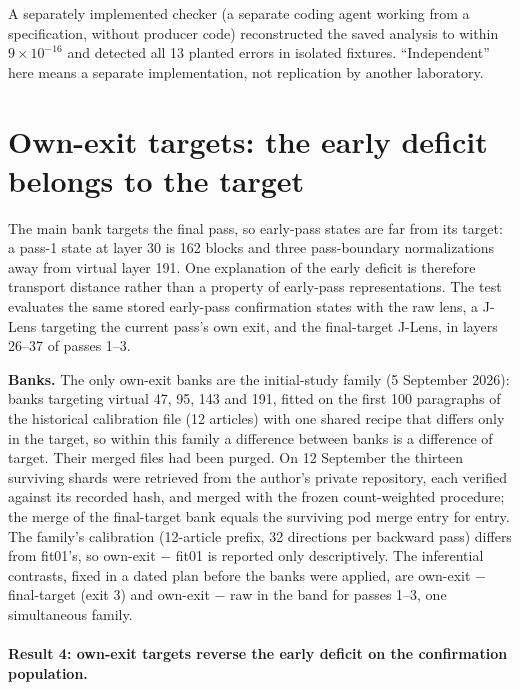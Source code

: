 A separately implemented checker (a separate coding agent working from a
specification, without producer code) reconstructed the saved analysis
to within \(9\times10^{-16}\) and detected all 13 planted errors in
isolated fixtures. ``Independent'' here means a separate implementation,
not replication by another laboratory.

\section{Own-exit targets: the early deficit belongs to the
target}\label{own-exit-targets-the-early-deficit-belongs-to-the-target}

The main bank targets the final pass, so early-pass states are far from
its target: a pass-1 state at layer 30 is 162 blocks and three
pass-boundary normalizations away from virtual layer 191. One
explanation of the early deficit is therefore transport distance rather
than a property of early-pass representations. The test evaluates the
same stored early-pass confirmation states with the raw lens, a J-Lens
targeting the current pass's own exit, and the final-target J-Lens, in
layers 26--37 of passes 1--3.

\textbf{Banks.} The only own-exit banks are the initial-study family (5
September 2026): banks targeting virtual 47, 95, 143 and 191, fitted on
the first 100 paragraphs of the historical calibration file (12
articles) with one shared recipe that differs only in the target, so
within this family a difference between banks is a difference of target.
Their merged files had been purged. On 12 September the thirteen
surviving shards were retrieved from the author's private repository,
each verified against its recorded hash, and merged with the frozen
count-weighted procedure; the merge of the final-target bank equals the
surviving pod merge entry for entry. The family's calibration
(12-article prefix, 32 directions per backward pass) differs from
fit01's, so own-exit − fit01 is reported only descriptively. The
inferential contrasts, fixed in a dated plan before the banks were
applied, are own-exit − final-target (exit 3) and own-exit − raw in the
band for passes 1--3, one simultaneous family.

\paragraph{Result 4: own-exit targets reverse the early deficit on the confirmation population.}

